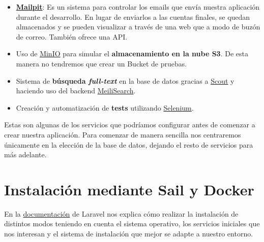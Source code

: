 \begin{itemize}
    \item \textbf{\href{https://github.com/axllent/mailpit}{Mailpit}}: Es un sistema para controlar los emails que envía nuestra aplicación durante el desarrollo. En lugar de enviarlos a las cuentas finales, se quedan almacenados y se pueden visualizar a través de una web que a modo de buzón de correo. También ofrece una API.

    \item Uso de  \href{https://min.io/}{MinIO} para simular el \textbf{almacenamiento en la nube S3}. De esta manera no tendremos que crear un Bucket de pruebas.

    \item Sistema de \textbf{búsqueda \textit{full-text}} en la base de datos gracias a \href{https://laravel.com/docs/10.x/scout#introduction}{Scout} y haciendo uso del backend \href{https://www.meilisearch.com/}{MeiliSearch}.

    \item Creación y automatización de \textbf{tests} utilizando \href{https://www.selenium.dev/}{Selenium}.
\end{itemize}

Estas son algunas de los servicios que podríamos configurar antes de comenzar a crear nuestra aplicación. Para comenzar de manera sencilla nos centraremos únicamente en la elección de la base de datos, dejando el resto de servicios para más adelante.


\section{Instalación mediante Sail y Docker}

En la \href{https://laravel.com/docs/10.x/installation}{documentación} de Laravel nos explica cómo realizar la instalación de distintos modos teniendo en cuenta el sistema operativo, los servicios iniciales que nos interesan y el sistema de instalación que mejor se adapte a nuestro entorno.

%
%

